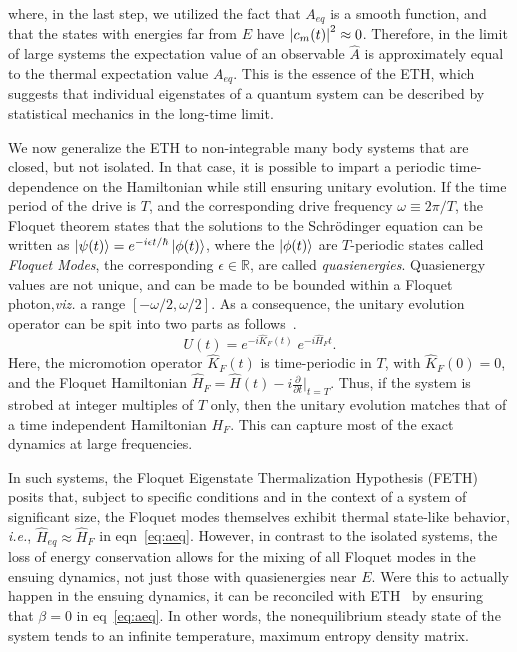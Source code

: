 \documentclass[%
reprint,
superscriptaddress,
amsmath,amssymb,
aps,
prb,
showkeys,
]{revtex4-2}
\begin{document}
where, in the last step, we utilized the fact that $A_{eq}$ is a smooth function, and that the states with energies far from $E$ have $\abs{c_m(t)}^2\approx 0$. Therefore, in the limit of large systems the expectation value of an observable $\hat{A}$ is approximately equal to the thermal expectation value $A_{eq}$. This is the essence of the ETH, which suggests that individual eigenstates of a quantum system can be described by statistical mechanics in the long-time limit.

We now generalize the ETH to non-integrable many body systems that are closed, but not isolated. In that case, it is possible to impart a periodic time-dependence on the Hamiltonian while still ensuring unitary evolution. If the time period of the drive is $T$, and the corresponding drive frequency $\omega\equiv 2\pi/T$, the Floquet theorem states that the solutions to the Schrödinger equation can be written as $\ket{\psi(t)} = e^{-i\epsilon t/\hbar} \ket{\phi(t)}$, where the $\ket{\phi(t)}$ are $T$-periodic states called \textit{Floquet Modes}, the corresponding $\epsilon\in \mathbb{R}$, are called \textit{quasienergies}. Quasienergy values are not unique, and can be made to be bounded within a Floquet photon,\textit{viz.} a range $[-\omega/2, \omega/2]$\cite{holthaus_floquet_2016,vogl_effective_2020}. As a consequence, the unitary evolution operator can be spit into two parts as follows~\cite{Bukov2014}.
\begin{equation}
	\label{eq:propagator}
	U(t) = e^{-i\hat{K}_F(t)}\;e^{-i\hat{H}_Ft}.
\end{equation}
Here, the micromotion operator $\hat{K}_F(t)$ is time-periodic in $T$, with $\hat{K}_F(0)=0$, and the Floquet Hamiltonian $\hat{H}_F = \hat{H}(t) - i \displaystyle\frac{\partial}{\partial t}\bigg\vert_{t=T}$. Thus, if the system is strobed at integer multiples of $T$ only, then the unitary evolution matches that of a time independent Hamiltonian $H_F$. This can capture most of the exact dynamics at large frequencies.

In such systems, the Floquet Eigenstate Thermalization Hypothesis (FETH) posits that, subject to specific conditions and in the context of a system of significant size, the Floquet modes themselves exhibit thermal state-like behavior, \textit{i.e.}, $\hat{H}_{eq}\approx \hat{H}_F$ in eqn~\ref{eq:aeq}. However, in contrast to the isolated systems, the loss of energy conservation allows for the mixing of all Floquet modes in the ensuing dynamics, not just those with quasienergies near $E$. Were this to actually happen in the ensuing dynamics, it can be reconciled with ETH~\cite{alessio} by ensuring that $\beta=0$ in eq~\ref{eq:aeq}. In other words, the nonequilibrium steady state of the system tends to an infinite temperature, maximum entropy density matrix.
\end{document}
